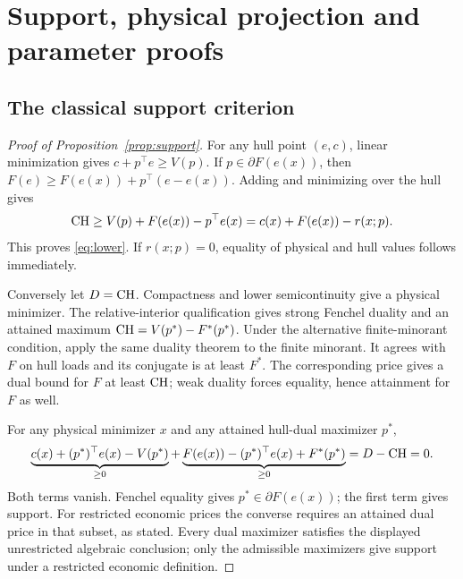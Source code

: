 \section{Support, physical projection and parameter proofs}
\subsection{The classical support criterion}\label{app:support}
\begin{proof}[Proof of Proposition~\ref{prop:support}]
For any hull point $(e,c)$, linear minimization gives
$c+p^\top e\ge V(p)$. If $p\in\partial F(e(x))$, then
$F(e)\ge F(e(x))+p^\top(e-e(x))$. Adding and minimizing over the hull
gives
\[
 \mathrm{CH}\ge V(p)+F(e(x))-p^\top e(x)
       =c(x)+F(e(x))-r(x;p).
\]
This proves \eqref{eq:lower}. If $r(x;p)=0$, equality of physical and hull
values follows immediately.

Conversely let $D=\mathrm{CH}$. Compactness and lower semicontinuity give a
physical minimizer. The relative-interior qualification gives strong
Fenchel duality and an attained maximum
$\mathrm{CH}=V(p^*)-F^*(p^*)$. Under the alternative finite-minorant condition,
apply the same duality theorem to the finite minorant. It agrees with $F$
on hull loads and its conjugate is at least $F^*$. The corresponding
price gives a dual bound for $F$ at least $\mathrm{CH}$; weak duality forces
equality, hence attainment for $F$ as well.

For any physical minimizer $x$ and any attained hull-dual maximizer $p^*$,
\[
 \underbrace{c(x)+(p^*)^\top e(x)-V(p^*)}_{\ge0}
 +\underbrace{F(e(x))-(p^*)^\top e(x)+F^*(p^*)}_{\ge0}
 =D-\mathrm{CH}=0.
\]
Both terms vanish. Fenchel equality gives $p^*\in\partial F(e(x))$;
the first term gives support. For restricted economic prices the converse
requires an attained dual price in that subset, as stated.
Every dual maximizer satisfies the displayed unrestricted algebraic
conclusion; only the admissible maximizers give support under a restricted
economic definition.
\end{proof}

